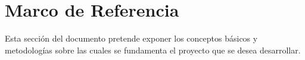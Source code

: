 \chapter{Marco de Referencia}
Esta sección del documento pretende exponer los conceptos básicos y metodologías sobre las cuales se fundamenta el proyecto que se desea desarrollar.



